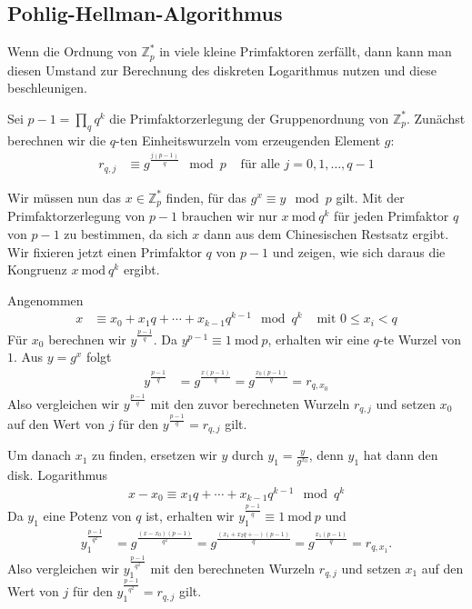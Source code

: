 \documentclass[
  a4paper,
  11pt,
]{scrartcl}
\theoremstyle{plain}
\theoremstyle{definition}
\theoremstyle{remark}
\newcommand{\Z}{\mathbb{Z}}
\newcommand{\Mod}[1]{\ \mathrm{mod}\ #1}
\begin{document}
\subsection{Pohlig-Hellman-Algorithmus}
\label{sub:pohlig_hellman_algorithmus}

Wenn die Ordnung von $\Z_p^*$ in viele kleine Primfaktoren zerfällt, dann kann
man diesen Umstand zur Berechnung des diskreten Logarithmus nutzen und diese
beschleunigen.

Sei $p-1 = \prod\limits_q q^k$ die Primfaktorzerlegung der Gruppenordnung von
$\Z_p^*$. Zunächst berechnen wir die $q$-ten Einheitswurzeln vom erzeugenden
Element $g$:
\begin{align*}
  r_{q, j} &
    \equiv g^{\frac{j(p-1)}{q}} \mod p &
    \text{ für alle } j = 0, 1, \ldots, q-1
\end{align*}

Wir müssen nun das $x \in \Z_p^*$ finden, für das $g^x \equiv y \mod p$ gilt.
Mit der Primfaktorzerlegung von $p-1$ brauchen wir nur $x \Mod{q^k}$ für jeden
Primfaktor $q$ von $p-1$ zu bestimmen, da sich $x$ dann aus dem Chinesischen
Restsatz ergibt. Wir fixieren jetzt einen Primfaktor $q$ von $p-1$ und zeigen,
wie sich daraus die Kongruenz $x \Mod{q^k}$ ergibt.

Angenommen
\begin{align*}
  x & \equiv x_0 + x_1 q + \cdots + x_{k-1} q^{k-1} \mod q^k
    & \text{ mit } 0 \leq x_i < q
\end{align*}
Für $x_0$ berechnen wir $y^{\frac{p-1}{q}}$. Da $y^{p-1} \equiv 1 \Mod{p}$,
erhalten wir eine $q$-te Wurzel von $1$. Aus $y = g^x$ folgt
\begin{align*}
  y^{\frac{p-1}{q}} &
    = g^{\frac{x(p-1)}{q}}
    = g^{\frac{x_0 (p-1)}{q}}
    = r_{q, x_0}
\end{align*}
Also vergleichen wir $y^{\frac{p-1}{q}}$ mit den zuvor berechneten Wurzeln
$r_{q, j}$ und setzen $x_0$ auf den Wert von $j$ für den
$y^{\frac{p-1}{q}} = r_{q, j}$ gilt.

Um danach $x_1$ zu finden, ersetzen wir $y$ durch $y_1 = \frac{y}{g^{x_0}}$,
denn $y_1$ hat dann den disk. Logarithmus
\begin{align*}
  x - x_0 \equiv x_1 q + \cdots + x_{k-1} q^{k-1} \mod q^k
\end{align*}
Da $y_1$ eine Potenz von $q$ ist, erhalten wir
$y_1^{\frac{p-1}{q}} \equiv 1 \Mod{p}$ und
\begin{align*}
  y_1^{\frac{p-1}{q^2}} &
    = g^{\frac{(x-x_0) (p-1)}{q^2}}
    = g^{\frac{(x_1 + x_2 q + \cdots) (p-1)}{q}}
    = g^{\frac{x_1 (p-1)}{q}}
    = r_{q, x_1}.
\end{align*}
Also vergleichen wir $y_1^{\frac{p-1}{q^2}}$ mit den berechneten Wurzeln
$r_{q, j}$ und setzen $x_1$ auf den Wert von $j$ für den
$y_1^{\frac{p-1}{q^2}} = r_{q, j}$ gilt.
\end{document}
